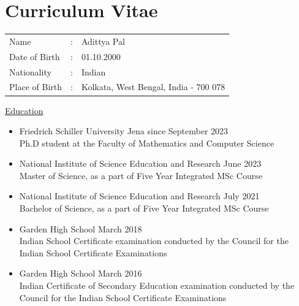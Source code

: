 \chapter{Curriculum Vitae}
\vspace{0.5cm}
\begin{tabular}{lll}
     Name &: & Adittya Pal  \\
     Date of Birth &: & 01.10.2000 \\
     Nationality &: & Indian \\
     Place of Birth &: & Kolkata, West Bengal, India - 700 078\\
\end{tabular}
\vspace{1cm}

\underline{\large{Education}}
\begin{itemize}
\item[-] Friedrich Schiller University Jena \hfill since September 2023\vspace{0.1cm}\\
	Ph.D student at the Faculty of Mathematics and Computer Science
\item[-] National Institute of Science Education and Research \hfill June 2023\vspace{0.1cm}\\
	Master of Science, as a part of Five Year Integrated MSc Course
\item[-] National Institute of Science Education and Research \hfill July 2021\vspace{0.1cm}\\ 
	Bachelor of Science, as a part of Five Year Integrated MSc Course
\item[-] Garden High School \hfill March 2018\vspace{0.1cm}\\
	Indian School Certificate examination conducted by the Council for the Indian School Certificate Examinations
\item[-] Garden High School \hfill March 2016\vspace{0.1cm}\\
	Indian Certificate of Secondary Education examination conducted by the Council for the Indian School Certificate Examinations
\end{itemize}
